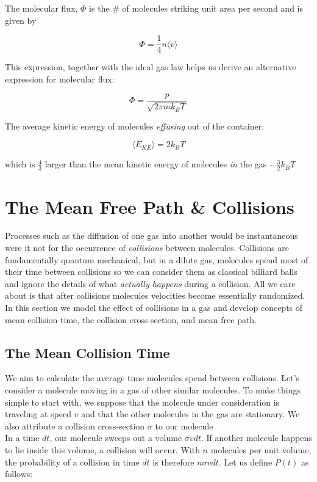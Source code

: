 \documentclass[svgnames]{article}     %
\begin{document}
The molecular flux, $\Phi$ is the \# of molecules striking unit area per second
and is given by 

\[
\Phi = \frac{1}{4}n\langle v \rangle
\] \vspace{5px}

This expression, together with the ideal gas law helps us derive an alternative
expression for molecular flux: 

\[
  \Phi = \frac{p}{\sqrt{2\pi m k_B T}}
\] \vspace{5px}

The average kinetic energy of molecules \textit{effusing} out of the container: 

\[
  \langle E_{KE} \rangle = 2k_B T
\] \vspace{5px}

which is $\frac{4}{3}$ larger than the mean kinetic energy of molecules
\textit{in} the gas -- $\frac{3}{2}k_B T$

\newpage
\section{The Mean Free Path \& Collisions}

Processes such as the diffusion of one gas into another would be instantaneous
were it not for the occurrence of \textit{collisions} between molecules.
Collisions are fundamentally quantum mechanical, but in a dilute gas, molecules
spend most of their time between collisions so we can consider them as
classical billiard balls and ignore the details of what \textit{actually
happens} during a collision. All we care about is that after collisions
molecules velocities become essentially randomized. In this section we model
the effect of collisions in a gas and develop concepts of mean collision time,
the collision cross section, and mean free path.

\subsection{The Mean Collision Time}

We aim to calculate the average time molecules spend between collisions. Let's
consider a molecule moving in a gas of other similar molecules. To make things
simple to start with, we suppose that the molecule under consideration is
traveling at speed $v$ and that the other molecules in the gas are stationary.
We also attribute a collision cross-section $\sigma$ to our molecule
\\
In a time $dt$, our molecule sweeps out a volume $\sigma v dt$. If another
molecule happens to lie inside this volume, a collision will occur. With $n$
molecules per unit volume, the probability of a collision in time $dt$ is
therefore $n\sigma v dt$. Let us define $P(t)$ as follows: 
\end{document}
